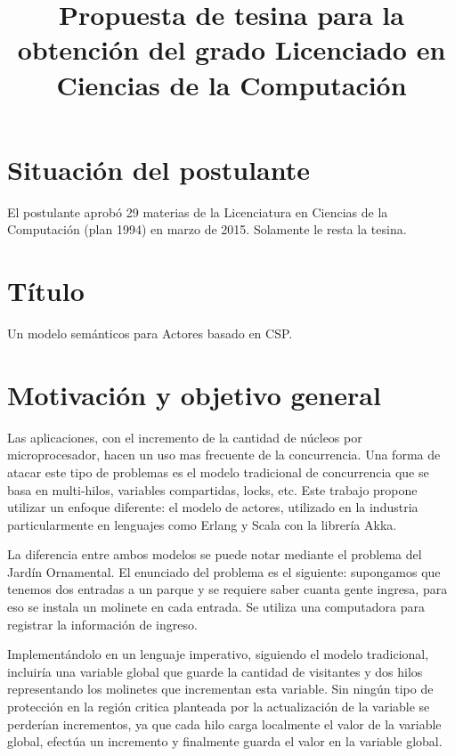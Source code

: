 \documentclass{article}
\begin{document}
\title{Propuesta de tesina para la obtención del grado
Licenciado en Ciencias de la Computación}

\maketitle

\section{Situación del postulante}
El postulante aprobó 29 materias de la Licenciatura en Ciencias de la Computación (plan 1994) en marzo de 2015. Solamente le resta la tesina.

\section{Título}
Un modelo semánticos para Actores basado en CSP.

\section{Motivación y objetivo general}

Las aplicaciones, con el incremento de la cantidad de núcleos por microprocesador, hacen un uso mas frecuente de la concurrencia. Una forma de atacar este tipo de problemas es el modelo tradicional de concurrencia que se basa en multi-hilos, variables compartidas, locks, etc. Este trabajo propone utilizar un enfoque diferente: el modelo de actores, utilizado en la industria particularmente en lenguajes como Erlang\cite{Cesarini:2009:EP:1717841} y Scala\cite{scala-overview-tech-report} con la librería Akka\cite{Wyatt:2013:AC:2663429}. 

La diferencia entre ambos modelos se puede notar mediante el problema del Jardín Ornamental. El enunciado del problema es el siguiente: supongamos que tenemos dos entradas a un parque y se requiere saber cuanta gente ingresa, para eso se instala un molinete en cada entrada. Se utiliza una computadora para registrar la información de ingreso.

Implementándolo en un lenguaje imperativo, siguiendo el modelo tradicional, incluiría una variable global que guarde la cantidad de visitantes y dos hilos representando los molinetes que incrementan esta variable. Sin ningún tipo de protección en la región critica planteada por la actualización de la variable se perderían incrementos, ya que cada hilo carga localmente el valor de la variable global, efectúa un incremento y finalmente guarda el valor en la variable global. 
\end{document}
